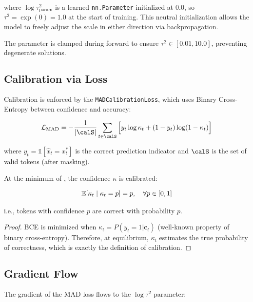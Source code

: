 where $\log \tau^2_{\text{param}}$ is a learned \texttt{nn.Parameter}
initialized at $0.0$, so $\tau^2 = \exp(0) = 1.0$ at the start of
training. This neutral initialization allows the model to freely
adjust the scale in either direction via backpropagation.

The parameter is clamped during forward to ensure
$\tau^2 \in [0.01, 10.0]$, preventing degenerate solutions.

\subsection{Calibration via Loss}

Calibration is enforced by the \texttt{MADCalibrationLoss}, which uses
Binary Cross-Entropy between confidence and accuracy:

\begin{equation}
    \calL_{\text{MAD}} = -\frac{1}{|\calS|}\sum_{t \in \calS} \Big[
        y_t \log \kappa_t + (1 - y_t) \log(1 - \kappa_t)
    \Big]
    \label{eq:mad_loss}
\end{equation}

where $y_t = \mathbb{1}[\hat{x}_t = x_t^*]$ is the correct prediction
indicator and $\calS$ is the set of valid tokens (after masking).

\begin{theorem}
\label{thm:calibration}
At the minimum of , the confidence $\kappa$ is
calibrated:

\begin{equation}
    \mathbb{E}[\kappa_t \mid \kappa_t = p] = p, \quad \forall p \in [0, 1]
\end{equation}

i.e., tokens with confidence $p$ are correct with probability $p$.
\end{theorem}

\begin{proof}
BCE is minimized when $\kappa_t = P(y_t = 1 | \bm{c}_t)$ (well-known
property of binary cross-entropy). Therefore, at equilibrium, $\kappa_t$
estimates the true probability of correctness, which is exactly the
definition of calibration.
\end{proof}

\subsection{Gradient Flow}

The gradient of the MAD loss flows to the $\log \tau^2$ parameter:

